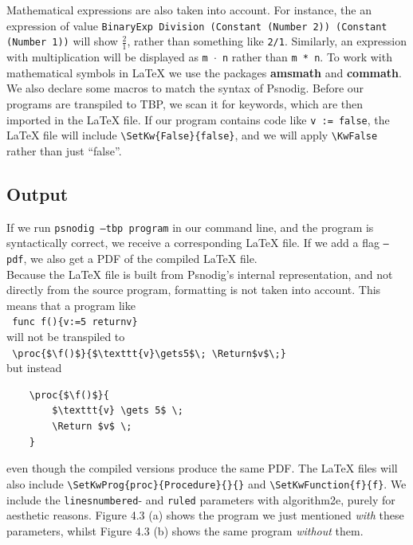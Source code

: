 Mathematical expressions are also taken into account. For instance, the an expression of value \texttt{BinaryExp Division (Constant (Number 2)) (Constant (Number 1))} will show $\frac{2}{1}$, rather than something like \texttt{2/1}. Similarly, an expression with multiplication will be displayed as \texttt{m $\cdot$ n} rather than \texttt{m * n}. To work with mathematical symbols in LaTeX we use the packages \textbf{amsmath} and \textbf{commath}. \hfill \\

We also declare some macros to match the syntax of Psnodig. Before our programs are transpiled to TBP, we scan it for keywords, which are then imported in the LaTeX file. If our program contains code like \texttt{v := false}, the LaTeX file will include \texttt{\textbackslash SetKw\{False\}\{false\}}, and we will apply \texttt{\textbackslash KwFalse} rather than just ``false''.

\subsection{Output}

If we run \texttt{psnodig --tbp program} in our command line, and the program is syntactically correct, we receive a corresponding LaTeX file. If we add a flag \texttt{--pdf}, we also get a PDF of the compiled LaTeX file. \hfill \\

Because the LaTeX file is built from Psnodig's internal representation, and not directly from the source program, formatting is not taken into account. This means that a program like \hfill \\

\texttt{ func f()\{v:=5 returnv\} } \hfill \\

will not be transpiled to \hfill \\

\texttt{ \textbackslash proc\{\$\textbackslash f()\$\}\{\$\textbackslash texttt\{v\}\textbackslash gets5\$\textbackslash ; \textbackslash Return\$v\$\textbackslash;\} } \hfill \\

but instead

\begin{verbatim}
    \proc{$\f()$}{
        $\texttt{v} \gets 5$ \;
        \Return $v$ \;
    }
\end{verbatim}

even though the compiled versions produce the same PDF. The LaTeX files will also include \texttt{\textbackslash SetKwProg\{proc\}\{Procedure\}\{\}\{\}} and \texttt{\textbackslash SetKwFunction\{f\}\{f\}}. We include the \texttt{linesnumbered}- and \texttt{ruled} parameters with algorithm2e, purely for aesthetic reasons. Figure 4.3 (a) shows the program we just mentioned \textit{with} these parameters, whilst Figure 4.3 (b) shows the same program \textit{without} them. \hfill \\

